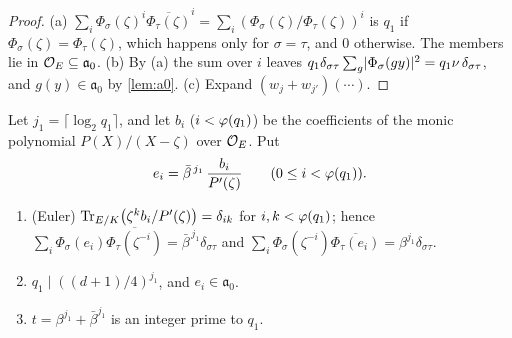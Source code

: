 \begin{proof}
(a) $\sum_i\Phi_\sigma(\zeta)^i\overline{\Phi_\tau(\zeta)}^i=\sum_i(\Phi_\sigma(\zeta)/\Phi_\tau(\zeta))^i$
is $q_1$ if $\Phi_\sigma(\zeta)=\Phi_\tau(\zeta)$, which happens only for $\sigma=\tau$, and $0$
otherwise. The members lie in $\mathcal{O}_E\subseteq\mathfrak a_0$. (b) By (a) the sum over $i$ leaves
$q_1\delta_{\sigma\tau}\sum_g\lvert \Phi_\sigma(g y)\rvert^2=q_1\nu\,\delta_{\sigma\tau}$, and $g(y)\in\mathfrak a_0$
by \cref{lem:a0}. (c) Expand $(w_j+w_{j'})(\cdots)$.
\end{proof}

Let $j_1=\lceil\log_2q_1\rceil$, and let $b_i$ ($i<\varphi(q_1)$) be the coefficients of the monic
polynomial $P(X)/(X-\zeta)$ over $\mathcal{O}_E$. Put
\[
  e_i=\bar\beta^{\,j_1}\,\frac{b_i}{P'(\zeta)}\qquad(0\le i<\varphi(q_1)).
\]

\begin{lemma}\label{lem:dual-vectors}
\begin{enumerate}[label=\textup{(\alph*)}]
\item (Euler) $\operatorname{Tr}_{E/K}\bigl(\zeta^k b_i/P'(\zeta)\bigr)=\delta_{ik}$ for $i,k<\varphi(q_1)$; hence
$\sum_i\Phi_\sigma(e_i)\overline{\Phi_\tau(\zeta^{-i})}=\bar\beta^{\,j_1}\delta_{\sigma\tau}$ and
$\sum_i\Phi_\sigma(\zeta^{-i})\overline{\Phi_\tau(e_i)}=\beta^{j_1}\delta_{\sigma\tau}$.
\item $q_1\mid((d+1)/4)^{j_1}$, and $e_i\in\mathfrak a_0$.
\item $t=\beta^{j_1}+\bar\beta^{j_1}$ is an integer prime to $q_1$.
\end{enumerate}
\end{lemma}

